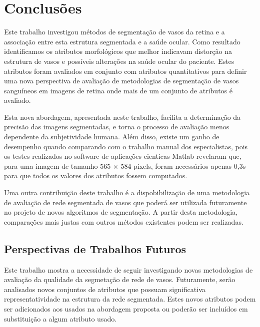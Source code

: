 
\chapter{Conclus\~{o}es}
\thispagestyle{empty}

Este trabalho investigou m\'{e}todos de segmenta\c{c}\~{a}o de vasos da retina e a associa\c{c}\~{a}o entre esta  estrutura segmentada e a sa\'{u}de ocular. Como resultado identificamos os atributos morfol\'{o}gicos que melhor indicavam distor\c{c}\~{a}o na estrutura de vasos e poss\'{i}veis altera\c{c}\~{o}es na sa\'{u}de ocular do paciente. Estes atributos foram avaliados em conjunto com atributos quantitativos para definir uma nova perspectiva de avalia\c{c}\~{a}o de metodologias de segmenta\c{c}\~{a}o de vasos sangu\'{i}neos em imagens de retina onde mais de um conjunto de atributos \'{e} avaliado.

Esta nova abordagem, apresentada neste trabalho, facilita a determina\c{c}\~{a}o da precis\~{a}o das imagens segmentadas, e torna o processo de avalia\c{c}\~{a}o menos dependente da subjetividade humana. Al\'{e}m disso, existe um ganho de desempenho quando comparando com o trabalho manual dos especialistas, pois os testes realizados no software de aplica\c{c}\~{o}es cient\'{i}cas Matlab revelaram que, para uma imagem de tamanho 565 $\times$ 584 pixels, foram necess\'{a}rios apenas 0,3s para que todos os valores dos atributos fossem computados. 

Uma outra contribui\c{c}\~{a}o deste trabalho \'{e} a dispobibiliza\c{c}\~{a}o de uma metodologia de avalia\c{c}\~{a}o de rede segmentada de vasos que poder\'{a} ser utilizada futuramente no projeto de novos algoritmos de segmenta\c{c}\~{a}o. A partir desta metodologia, compara\c{c}\~{o}es mais justas com outros m\'{e}todos existentes podem ser realizadas. 

\section{Perspectivas de Trabalhos Futuros}

Este trabalho mostra a necessidade de seguir investigando novas metodologias de avalia\c{c}\~{a}o da qualidade da segmeta\c{c}\~{a}o de rede de vasos.  Futuramente, ser\~{a}o analisados novos conjuntos de atributos que possuam significativa representatividade na estrutura da rede segmentada. Estes novos atributos podem ser adicionados aos usados na abordagem proposta ou poder\~{a}o ser inclu\'{i}dos em substitui\c{c}\~{a}o a algum atributo usado.

 
